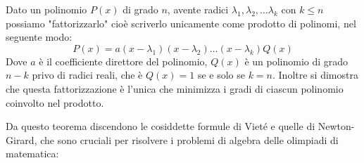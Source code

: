 \documentclass[11pt]{scrartcl}
\begin{document}
	\begin{theorem}
		Dato un polinomio $P(x)$ di grado $n$, avente radici $\lambda_1,\lambda_2,\dots\lambda_k$ con $k\le n$ possiamo "fattorizzarlo" cioè scriverlo unicamente come prodotto di polinomi, nel seguente modo:
		$$P(x)=a(x-\lambda_1)(x-\lambda_2)\dots(x-\lambda_k)Q(x)$$
		Dove $a$ è il coefficiente direttore del polinomio, $Q(x)$ è un polinomio di grado $n-k$ privo di radici reali, che è $Q(x)=1$ se e solo se $k=n$.
		Inoltre si dimostra che questa fattorizzazione è l'unica che minimizza i gradi di ciascun polinomio coinvolto nel prodotto.
	\end{theorem}
	Da questo teorema discendono le cosiddette formule di Vieté e quelle di Newton-Girard, che sono cruciali per risolvere i problemi di algebra delle olimpiadi di matematica:
	
\end{document}
